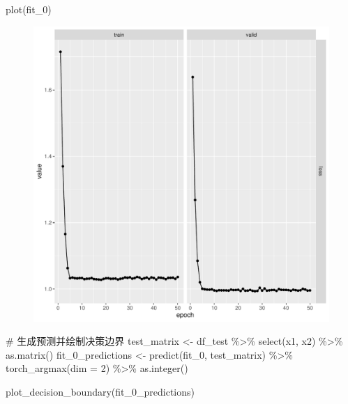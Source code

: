 \documentclass[
  letterpaper,
  DIV=11,
  numbers=noendperiod]{scrartcl}
\newenvironment{Shaded}{\begin{snugshade}}{\end{snugshade}}
\newcommand{\AttributeTok}[1]{\textcolor[rgb]{0.40,0.45,0.13}{#1}}
\newcommand{\CommentTok}[1]{\textcolor[rgb]{0.37,0.37,0.37}{#1}}
\newcommand{\DecValTok}[1]{\textcolor[rgb]{0.68,0.00,0.00}{#1}}
\newcommand{\FunctionTok}[1]{\textcolor[rgb]{0.28,0.35,0.67}{#1}}
\newcommand{\NormalTok}[1]{\textcolor[rgb]{0.00,0.23,0.31}{#1}}
\newcommand{\OtherTok}[1]{\textcolor[rgb]{0.00,0.23,0.31}{#1}}
\newcommand{\SpecialCharTok}[1]{\textcolor[rgb]{0.37,0.37,0.37}{#1}}
\begin{document}
\begin{Shaded}
\begin{Highlighting}[]
\FunctionTok{plot}\NormalTok{(fit\_0)}
\end{Highlighting}
\end{Shaded}

\begin{figure}[H]

{\centering \includegraphics{hw5_files/figure-pdf/unnamed-chunk-34-1.pdf}

}

\end{figure}

\begin{Shaded}
\begin{Highlighting}[]
\CommentTok{\# 生成预测并绘制决策边界}
\NormalTok{test\_matrix }\OtherTok{\textless{}{-}}\NormalTok{ df\_test }\SpecialCharTok{\%\textgreater{}\%} \FunctionTok{select}\NormalTok{(x1, x2) }\SpecialCharTok{\%\textgreater{}\%} \FunctionTok{as.matrix}\NormalTok{()}
\NormalTok{fit\_0\_predictions }\OtherTok{\textless{}{-}} \FunctionTok{predict}\NormalTok{(fit\_0, test\_matrix) }\SpecialCharTok{\%\textgreater{}\%}
  \FunctionTok{torch\_argmax}\NormalTok{(}\AttributeTok{dim =} \DecValTok{2}\NormalTok{) }\SpecialCharTok{\%\textgreater{}\%}
  \FunctionTok{as.integer}\NormalTok{()}


\FunctionTok{plot\_decision\_boundary}\NormalTok{(fit\_0\_predictions)}
\end{Highlighting}
\end{Shaded}
\end{document}
